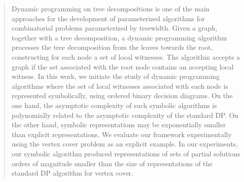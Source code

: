 \begin{abstract}
Dynamic programming on tree decompositions is one of the main approaches for the development of parameterized algorithms for combinatorial problems parameterized by treewidth. Given a graph, together with a tree decomposition, a dynamic programming algorithm processes the tree decomposition from the leaves towards the root, constructing for each node a set of local witnesses. The algorithm accepts a graph if the set associated with the root node contains an accepting local witness. In this work, we initiate the study of dynamic programming algorithms where the set of local witnesses associated with each node is represented symbolically, using ordered binary decision diagrams. On the one hand, the asymptotic complexity of such symbolic algorithms is polynomially related to the asymptotic complexity of the standard DP. On the other hand, symbolic representations may be exponentially smaller than explicit representations. We evaluate our framework experimentally using the vertex cover problem as an explicit example. In our experiments, our symbolic algorithm produced representations of sets of partial solutions orders of magnitude smaller than the size of representations of the standard DP algorithm for vertex cover. 
\end{abstract}
